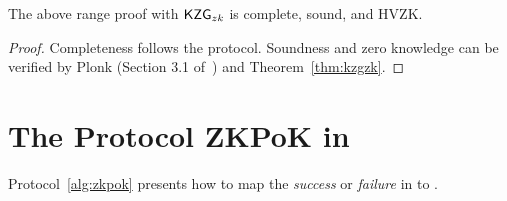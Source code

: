 \begin{theorem}
The above range proof with $\mathsf{KZG}_{zk}$ is complete, sound, and HVZK.
\end{theorem}
\begin{proof}
Completeness follows the protocol. Soundness and zero knowledge can be verified by Plonk (Section 3.1 of~\cite{plonk}) and Theorem~\ref{thm:kzgzk}.
\end{proof}

\section{The Protocol ZKPoK in \bootstrap}
\label{alg:map}

Protocol~\ref{alg:zkpok} presents how to map the \textit{success} or \textit{failure} in \secp to \bls.



